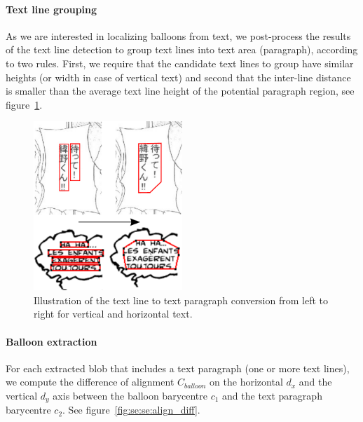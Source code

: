 \paragraph{Text line grouping} %
\label{par:text_line_grouping}

As we are interested in localizing balloons from text, we post-process the results of the text line detection to group text lines into text area (paragraph), according to two rules.
First, we require that the candidate text lines to group have similar heights (or width in case of vertical text) and second that the inter-line distance is smaller than the average text line height of the potential paragraph region, see figure~\ref{fig:se:se:line_to_paragraphs}.

	\begin{figure}[h!]	%
	  \centering
		\includegraphics[trim= 0px 0px 0px 0px, clip, width=0.5\textwidth]{line_to_paragraphs.pdf}
		\caption{Illustration of the text line to text paragraph conversion from left to right for vertical and horizontal text.}
		\label{fig:se:se:line_to_paragraphs}
	\end{figure}


\paragraph{Balloon extraction} %
\label{par:balloon_extraction}

For each extracted blob that includes a text paragraph (one or more text lines), we compute the difference of alignment $C_{balloon}$ on the horizontal $d_x$ and the vertical $d_y$ axis between the balloon barycentre $c_1$ and the text paragraph barycentre $c_2$.
See figure~\ref{fig:se:se:align_diff}.

